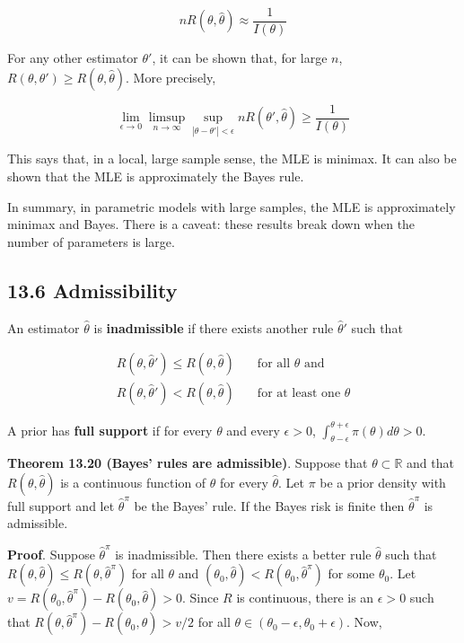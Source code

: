 \[ n R(\theta, \hat{\theta}) \approx \frac{1}{I(\theta)}\]

For any other estimator \(\theta'\), it can be shown that, for large
\(n\), \(R(\theta, \theta') \geq R(\theta, \hat{\theta})\). More
precisely,

\[ \lim_{\epsilon \rightarrow 0} \limsup_{n \rightarrow \infty} \sup_{|\theta - \theta'| < \epsilon} n R(\theta', \hat{\theta}) \geq \frac{1}{I(\theta)} \]

This says that, in a local, large sample sense, the MLE is minimax. It
can also be shown that the MLE is approximately the Bayes rule.

In summary, in parametric models with large samples, the MLE is
approximately minimax and Bayes. There is a caveat: these results break
down when the number of parameters is large.

\subsection{13.6 Admissibility}\label{admissibility}

An estimator \(\hat{\theta}\) is \textbf{inadmissible} if there exists
another rule \(\hat{\theta}'\) such that

\begin{align}
R(\theta, \hat{\theta}') \leq R(\theta, \hat{\theta}) & \quad \text{for all } \theta \text{ and} \\
R(\theta, \hat{\theta}') < R(\theta, \hat{\theta}) & \quad \text{for at least one } \theta
\end{align}

A prior has \textbf{full support} if for every \(\theta\) and every
\(\epsilon > 0\),
\(\int_{\theta - \epsilon}^{\theta + \epsilon} \pi(\theta) d\theta > 0\).

\textbf{Theorem 13.20 (Bayes' rules are admissible)}. Suppose that
\(\theta \subset \mathbb{R}\) and that \(R(\theta, \hat{\theta})\) is a
continuous function of \(\theta\) for every \(\hat{\theta}\). Let
\(\pi\) be a prior density with full support and let
\(\hat{\theta}^\pi\) be the Bayes' rule. If the Bayes risk is finite
then \(\hat{\theta}^\pi\) is admissible.

\textbf{Proof}. Suppose \(\hat{\theta}^\pi\) is inadmissible. Then there
exists a better rule \(\hat{\theta}\) such that
\(R(\theta, \hat{\theta}) \leq R(\theta, \hat{\theta}^\pi)\) for all
\(\theta\) and
\((\theta_0, \hat{\theta}) < R(\theta_0, \hat{\theta}^\pi)\) for some
\(\theta_0\). Let
\(v = R(\theta_0, \hat{\theta}^\pi) - R(\theta_0, \hat{\theta}) > 0\).
Since \(R\) is continuous, there is an \(\epsilon > 0\) such that
\(R(\theta, \hat{\theta}^\pi) - R(\theta_0, \hat{\theta}) > v/2\) for
all \(\theta \in (\theta_0 - \epsilon, \theta_0 + \epsilon)\). Now,

